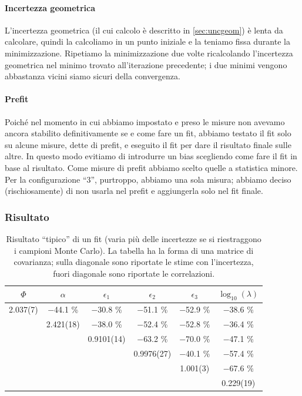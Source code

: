 \paragraph{Incertezza geometrica}

L'incertezza geometrica (il cui calcolo è descritto in \autoref{sec:uncgeom})
è lenta da calcolare, quindi la calcoliamo in un punto iniziale e la teniamo fissa durante la minimizzazione.
Ripetiamo la minimizzazione due volte ricalcolando l'incertezza geometrica nel minimo trovato all'iterazione precedente;
i due minimi vengono abbastanza vicini siamo sicuri della convergenza.

\paragraph{Prefit}

Poiché nel momento in cui abbiamo impostato e preso le misure
non avevamo ancora stabilito definitivamente se e come fare un fit,
abbiamo testato il fit solo su alcune misure, dette di prefit,
e eseguito il fit per dare il risultato finale sulle altre.
In questo modo evitiamo di introdurre un bias scegliendo come fare il fit in base al risultato.
Come misure di prefit abbiamo scelto quelle a statistica minore.
Per la configurazione ``3'', purtroppo, abbiamo una sola misura;
abbiamo deciso (rischiosamente) di non usarla nel prefit e aggiungerla solo nel fit finale.

\subsubsection{Risultato}
\label{sec:risultato}

\begin{table}
	\centering
	\begin{tabular}{cc|ccc|c}
		$\Phi$   & $\alpha$   & $\epsilon_1$ & $\epsilon_2$ & $\epsilon_3$ & $\log_{10}(\lambda)$ \\ \hline\hline
		2.037(7) &   $-$44.1 \% &    $-$30.8 \% &    $-$51.1 \% &  $-$52.9 \% &   $-$38.6 \% \\
		         & 2.421(18) &    $-$38.0 \% &    $-$52.4 \% &  $-$52.8 \% &   $-$36.4 \% \\ \hline
		         &           & 0.9101(14) &    $-$63.2 \% &  $-$70.0 \% &   $-$47.1 \% \\
		         &           &            & 0.9976(27) &  $-$40.1 \% &   $-$57.4 \% \\
		         &           &            &            & 1.001(3) &   $-$67.6 \% \\ \hline
		         &           &            &            &          & 0.229(19)
	\end{tabular}
	\caption{\label{tab:cov}
	Risultato ``tipico'' di un fit
	(varia più delle incertezze se si riestraggono i campioni Monte Carlo).
	La tabella ha la forma di una matrice di covarianza;
	sulla diagonale sono riportate le stime con l'incertezza,
	fuori diagonale sono riportate le correlazioni.}
\end{table}

